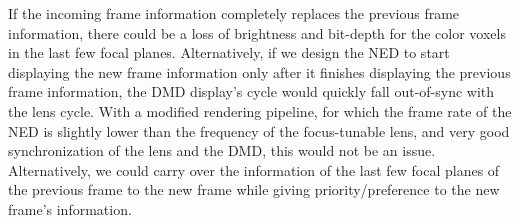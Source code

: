 If the incoming frame information completely replaces the previous frame information, there could be a loss of brightness and bit-depth for the color voxels in the last few focal planes. Alternatively, if we design the NED to start displaying the new frame information only after it finishes displaying the previous frame information, the DMD display's cycle would quickly fall out-of-sync with the lens cycle. With a modified rendering pipeline, for which the frame rate of the NED is slightly lower than the frequency of the focus-tunable lens, and very good synchronization of the lens and the DMD, this would not be an issue. Alternatively, we could carry over the information of the last few focal planes of the previous frame to the new frame while giving priority/preference to the new frame's information. 

